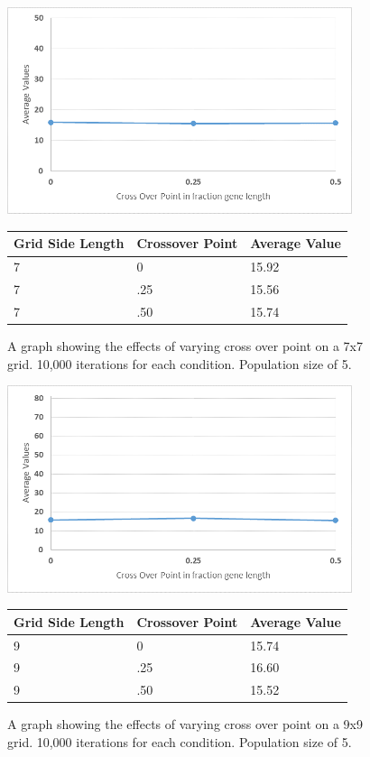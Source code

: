 \documentclass[12pt]{article}
\begin{document}
\begin{figure}[H]
    \centering
    \includegraphics[width=0.9\textwidth]{7x7_GA_Cross}
\begin{tabular}{ |p{4cm}||p{4cm}|p{4cm}|  }
 \hline
Grid Side Length&Crossover Point&Average Value\\
 \hline
7&0&15.92\\
7&.25&15.56\\
7&.50&15.74\\
 \hline
\end{tabular}
    \caption{A graph showing the effects of varying cross over point on a 7x7 grid. 10,000 iterations for each condition. Population size of 5.}
    \label{fig:GAcross7x7}
\end{figure}

\begin{figure}[H]
    \centering
    \includegraphics[width=0.9\textwidth]{9x9_GA_cross}
\begin{tabular}{ |p{4cm}||p{4cm}|p{4cm}|  }
 \hline
Grid Side Length&Crossover Point&Average Value\\
 \hline
9&0&15.74\\
9&.25&16.60\\
9&.50&15.52\\
 \hline
\end{tabular}
    \caption{A graph showing the effects of varying cross over point on a 9x9 grid. 10,000 iterations for each condition. Population size of 5.}
    \label{fig:GAcross7x7}
\end{figure}
\end{document}
